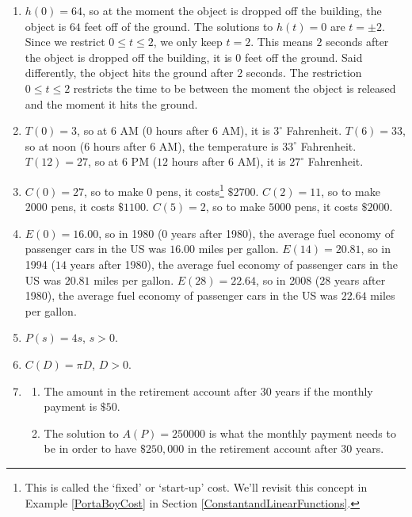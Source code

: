 \documentclass{ximera}
\begin{document}
\begin{enumerate}
\item $h(0) = 64$, so at the moment the object is dropped off the building, the object is $64$ feet off of the ground.  The solutions to $h(t) = 0$ are $t = \pm 2$.  Since we restrict $0 \leq t \leq 2$, we only keep $t = 2$.  This means $2$ seconds after the object is dropped off the building, it is $0$ feet off the ground.  Said differently, the object hits the ground after $2$ seconds.  The restriction  $0 \leq t \leq 2$ restricts the time to be between the moment the object is released and the moment it hits the ground.


\item  $T(0) = 3$, so at 6 AM ($0$ hours after 6 AM), it is $3^{\circ}$ Fahrenheit.  $T(6) = 33$, so at noon ($6$ hours after 6 AM), the temperature is $33^{\circ}$ Fahrenheit.  $T(12) = 27$, so at 6 PM ($12$ hours after 6 AM), it is $27^{\circ}$ Fahrenheit.


\item $C(0) = 27$, so to make $0$ pens, it costs\footnote{This is called the `fixed' or `start-up' cost.  We'll revisit this concept in Example \ref{PortaBoyCost} in Section \ref{ConstantandLinearFunctions}.} $\$ 2700$.  $C(2) = 11$, so to make $2000$ pens, it costs $\$1100$.  $C(5) = 2$, so to make $5000$ pens, it costs $\$2000$.

\item $E(0) = 16.00$, so in 1980 ($0$ years after 1980), the average fuel economy of passenger cars in the US was $16.00$ miles per gallon.  $E(14) = 20.81$, so in 1994 ($14$ years after 1980), the average fuel economy of passenger cars in the US was $20.81$ miles per gallon.  $E(28) = 22.64$, so in 2008 ($28$ years after 1980), the average fuel economy of passenger cars in the US was $22.64$ miles per gallon.  


\item  $P(s) = 4s$, $s > 0$.

\item  $C(D) = \pi D$,  $D > 0$.

\item

\begin{enumerate}

\item The amount in the retirement account after 30 years if the monthly payment is $\$50$.

\item  The solution to $A(P) = 250000$ is what the monthly payment needs to be in order to have $\$250,\!000$ in the retirement account after 30 years.


\end{enumerate}
\end{enumerate}
\end{document}
